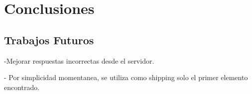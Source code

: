 
\chapter{Conclusiones} \label{cap:conclusiones}

\section{Trabajos Futuros} \label{cap:conclusiones:trabajos_futuros}

-Mejorar respuestas incorrectas desde el servidor.

- Por simplicidad momentanea, se utiliza como shipping solo el primer elemento encontrado.
